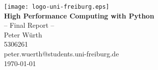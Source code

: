 \documentclass[a4paper,12pt]{article}
\makeatletter
\newcommand{\thetitle}{High Performance Computing with Python}
\newcommand{\thesubtitle}{-- Final Report --}
\newcommand{\theauthor}{Peter Würth}
\newcommand{\thematnr}{5306261}
\newcommand{\theemail}{peter.wuerth@students.uni-freiburg.de}
\newcommand{\thedate}{\today}
\makeatother
\begin{document}
    \begin{titlepage}
        \begin{center}
            \begin{singlespace}
                \texttt{[image: logo-uni-freiburg.eps]}\\[4\baselineskip]
                {\huge\textbf{\thetitle}}\\[1\baselineskip]
                {\Large\thesubtitle}\\[3\baselineskip]
                {\large \theauthor \\ \thematnr \\ \theemail}\\\vfill
                \thedate
            \end{singlespace}
        \end{center}
    \end{titlepage}

    \tableofcontents

    
    
    
    
    

	\nocite{*}
    \printbibliography[title=References]
\end{document}

